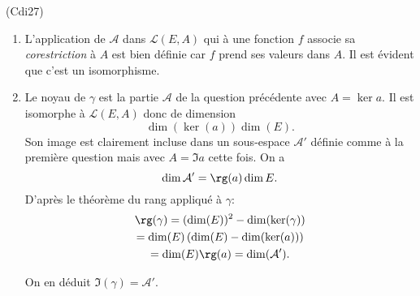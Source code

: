 \begin{tiny}(Cdi27)\end{tiny} 
\begin{enumerate}
  \item L'application de $\mathcal{A}$ dans $\mathcal{L}(E,A)$ qui à une fonction $f$ associe sa \emph{corestriction} à $A$ est bien définie car $f$ prend ses valeurs dans $A$. Il est évident que c'est un isomorphisme.
  \item Le noyau de $\gamma$ est la partie $\mathcal{A}$ de la question précédente avec $A = \ker a$. Il est isomorphe à $\mathcal{L}(E,A)$ donc de dimension 
\[
  \dim( \ker(a)) \dim(E).
\]
Son image est clairement incluse dans un sous-espace $\mathcal{A}'$ définie comme à la première question mais avec $A= \Im a$ cette fois. On a
\[
  \dim \mathcal{A}' = \rg(a) \dim E.
\]
D'après le théorème du rang appliqué à $\gamma$:
\begin{multline*}
  \rg(\gamma) = (\dim(E))^2 - \dim(\ker(\gamma))\\
  = \dim(E) \left( \dim(E) - \dim(\ker(a)) \right)\\
  = \dim(E) \rg(a) = \dim(\mathcal{A}').
\end{multline*}

On en déduit $\Im(\gamma) = \mathcal{A}'$.
\end{enumerate}

